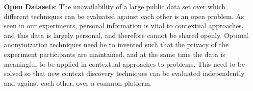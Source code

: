 \textbf{\textbf{Open Datasets}}: The unavailability of a large public data set over which different techniques can be evaluated against each other is an open problem. As seen in our experiments, personal information is vital to contextual approaches, and this data is largely personal, and therefore cannot be shared openly. Optimal anonymization techniques need be to invented such that the privacy of the experiment participants are maintained, and at the same time the data is meaningful to be applied in contextual approaches to problems. This need to be solved so that new context discovery techniques can be evaluated independently and against each other, over a common platform.